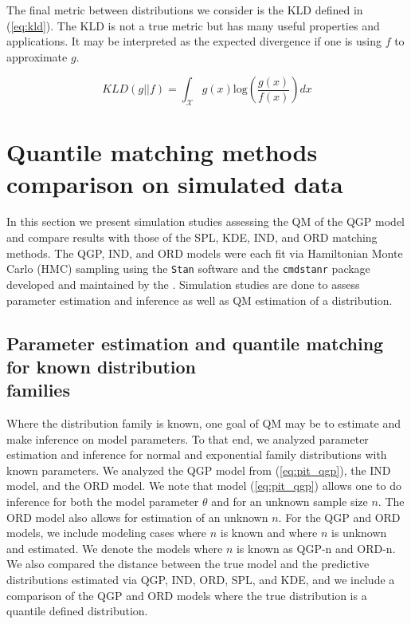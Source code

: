 \documentclass[preprint,12pt,authoryear]{elsarticle}
\newcommand{\1}[1]{\mathds{1}\left[#1\right]}
\begin{document}
The final metric between distributions we consider is the KLD defined in 
(\ref{eq:kld}). The KLD is not a true metric but has many useful properties 
and applications. It may be interpreted as the expected divergence if one is 
using $f$ to approximate $g$. 


\begin{equation}
    \label{eq:kld}
    KLD(g || f) = \int_{\mathcal{X}} 
    g(x) \text{log} \left( \frac{g(x)}{f(x)} \right) dx
\end{equation}



\section{Quantile matching methods comparison on simulated data} \label{sec:simulation_analyses}

In this section we present simulation studies assessing the QM of the
QGP model and compare results with those of the SPL, KDE, IND, and ORD matching
methods. The QGP, IND, and ORD models were each fit via Hamiltonian Monte Carlo
(HMC) sampling using the \texttt{Stan} software and the \texttt{cmdstanr}
package developed and maintained by the \cite{stan2024manual}
\cite[]{gabry2022stan}. Simulation studies are done to assess parameter
estimation and inference as well as QM estimation of a distribution.



\subsection{Parameter estimation and quantile matching for known distribution \\families} 

Where the distribution family is known, one goal of QM may be to estimate and 
make inference on model parameters. To that end, we analyzed 
parameter estimation and inference for normal and exponential family 
distributions with known parameters. We analyzed the QGP model from 
(\ref{eq:pit_qgp}), the IND model, and the ORD model. We note that model 
(\ref{eq:pit_qgp}) allows one to do inference for both the model parameter 
$\theta$ and for an unknown sample size $n$. The ORD model also allows for 
estimation of an unknown $n$. For the QGP and ORD models, we include modeling 
cases where $n$ is known and where $n$ is unknown and estimated. We denote the 
models where $n$ is known as QGP-n and ORD-n. We also compared the distance 
between the true model and the predictive distributions estimated via QGP, IND, 
ORD, SPL, and KDE, and we include a comparison of the QGP and ORD models 
where the true distribution is a quantile defined distribution.
\end{document}

